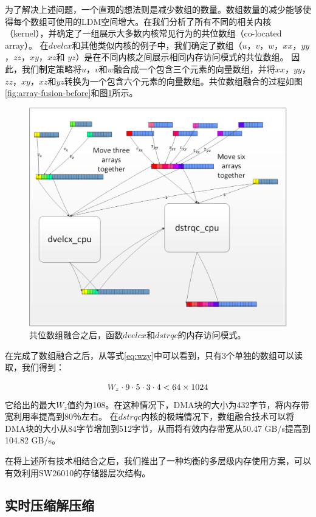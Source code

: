 \documentclass[degree=doctor]{thuthesis}
\begin{document}
为了解决上述问题，一个直观的想法则是减少数组的数量。数组数量的减少能够使得每个数组可使用的LDM空间增大。在我们分析了所有不同的相关内核（kernel），并确定了一组展示大多数内核常见行为的共位数组（co-located array）。 在$ dvelcx $和其他类似内核的例子中，我们确定了数组（$ u $，$ v $，$ w $，$ xx $，$ yy $，$ zz $，$ xy $，$ xz $和 $ yz $）是在不同内核之间展示相同内存访问模式的共位数组。 因此，我们制定策略将$ u $，$ v $和$ w $融合成一个包含三个元素的向量数组，并将$ xx $，$ yy $，$ zz $，$ xy $，$ xz $和$ yz $转换为一个包含六个元素的向量数组。共位数组融合的过程如图\ref{fig:array-fusion-before}和图\ref{fig:array-fusion-after}所示。

\begin{figure}[ht]
\centering
\includegraphics[width=0.7\columnwidth]{awp_after.png}
\caption{共位数组融合之后，函数$dvelcx$和$dstrqc$的内存访问模式。}
\label{fig:array-fusion-after}
\end{figure}

在完成了数组融合之后，从等式\ref{eq:wzy}中可以看到，只有3个单独的数组可以读取，我们得到：

\begin{equation}
W_z \cdot 9 \cdot 5 \cdot 3 \cdot 4 < 64 \times 1024\\
\label{eq:wzy2}
\end{equation}
它给出的最大$ W_z $值约为108。在这种情况下，DMA块的大小为432字节，将内存带宽利用率提高到80％左右。 在$ dstrqc $内核的极端情况下，数组融合技术可以将DMA块的大小从84字节增加到512字节，从而将有效内存带宽从50.47 GB/s提高到104.82 GB/s。


在将上述所有技术相结合之后，我们推出了一种均衡的多层级内存使用方案，可以有效利用SW26010的存储器层次结构。

\subsection{实时压缩解压缩}
\end{document}
